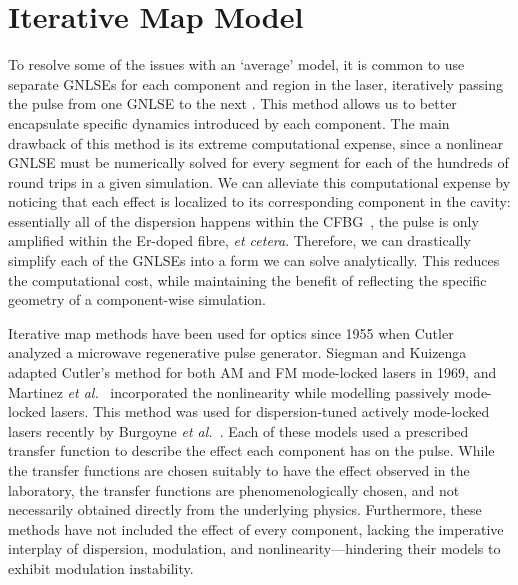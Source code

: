 \documentclass[9pt,twocolumn,twoside]{osajnl}
\begin{document}
\section{Iterative Map Model}
\label{sec:model}
To resolve some of the issues with an `average' model, it is common to use separate GNLSEs for each component and region in the laser, iteratively passing the pulse from one GNLSE to the next \cite{lapre2019, meng2020, oktem2010, woodward2018}. This method allows us to better encapsulate specific dynamics introduced by each component. The main drawback of this method is its extreme computational expense, since a nonlinear GNLSE must be numerically solved for every segment for each of the hundreds of round trips in a given simulation. We can alleviate this computational expense by noticing that each effect is localized to its corresponding component in the cavity: essentially all of the dispersion happens within the CFBG~\cite{agrawal2002}, the pulse is only amplified within the Er-doped fibre, \emph{et cetera}. Therefore, we can drastically simplify each of the GNLSEs into a form we can solve analytically. This reduces the computational cost, while maintaining the benefit of reflecting the specific geometry of a component-wise simulation.

Iterative map methods have been used for optics since 1955 when Cutler~\cite{cutler1955} analyzed a microwave regenerative pulse generator. Siegman and Kuizenga~\cite{kuizenga1970a, kuizenga1970b, kuizenga1970, siegman1969} adapted Cutler's method for both AM and FM mode-locked lasers in 1969, and Martinez \emph{et al.}~\cite{martinez1984, martinez1985} incorporated the nonlinearity while modelling passively mode-locked lasers. This method was used for dispersion-tuned actively mode-locked lasers recently by Burgoyne \emph{et al.}~\cite{burgoyne2014}. Each of these models used a prescribed transfer function to describe the effect each component has on the pulse. While the transfer functions are chosen suitably to have the effect observed in the laboratory, the transfer functions are phenomenologically chosen, and not necessarily obtained directly from the underlying physics. Furthermore, these methods have not included the effect of every component, lacking the imperative interplay of dispersion, modulation, and nonlinearity---hindering their models to exhibit modulation instability.
\end{document}
